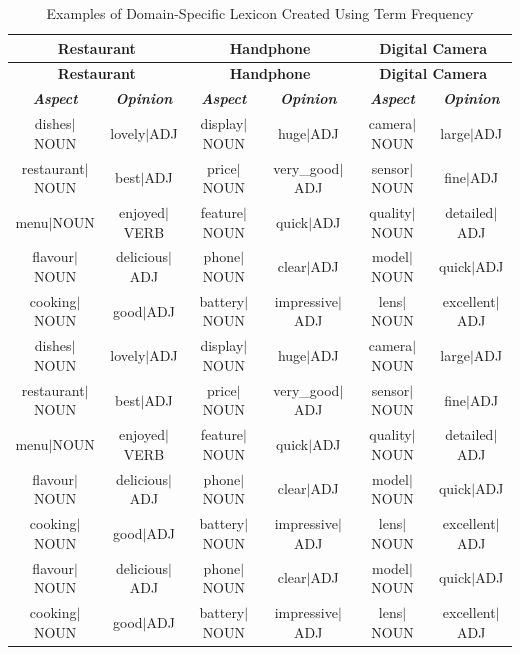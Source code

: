 \documentclass[a4paper,conference]{IEEEtran}
\begin{document}
\begin{table}[htbp]
\caption{Examples of Domain-Specific Lexicon Created Using Term Frequency}
\begin{center}
\begin{tabular}{|c|c|c|c|c|c|}
\hline
\multicolumn{2}{|c|}{\textbf{Restaurant}}&\multicolumn{2}{|c|}{\textbf{Handphone}}&\multicolumn{2}{|c|}{\textbf{Digital Camera}}\\
\hline
\multicolumn{2}{|c|}{\textbf{Restaurant}}&\multicolumn{2}{|c|}{\textbf{Handphone}}&\multicolumn{2}{|c|}{\textbf{Digital Camera}}\\
\hline 
\textbf{\textit{Aspect}}& \textbf{\textit{Opinion}}&\textbf{\textit{Aspect}}& \textbf{\textit{Opinion}}&\textbf{\textit{Aspect}}& \textbf{\textit{Opinion}}\\
\hline
dishes$\vert$NOUN&lovely$\vert$ADJ&display$\vert$NOUN & huge$\vert$ADJ& camera$\vert$NOUN& large$\vert$ADJ\\
\hline
restaurant$\vert$NOUN&best$\vert$ADJ&price$\vert$NOUN&very\_good$\vert$ADJ&sensor$\vert$NOUN&fine$\vert$ADJ\\
\hline
menu$\vert$NOUN&enjoyed$\vert$VERB&feature$\vert$NOUN&quick$\vert$ADJ&quality$\vert$NOUN&detailed$\vert$ADJ  \\
\hline
flavour$\vert$NOUN&delicious$\vert$ADJ&phone$\vert$NOUN&clear$\vert$ADJ&model$\vert$NOUN&quick$\vert$ADJ \\
\hline
cooking$\vert$NOUN&good$\vert$ADJ&battery$\vert$NOUN&impressive$\vert$ADJ&lens$\vert$NOUN&excellent$\vert$ADJ \\
\hline
dishes$\vert$NOUN&lovely$\vert$ADJ&display$\vert$NOUN & huge$\vert$ADJ& camera$\vert$NOUN& large$\vert$ADJ\\
\hline
restaurant$\vert$NOUN&best$\vert$ADJ&price$\vert$NOUN&very\_good$\vert$ADJ&sensor$\vert$NOUN&fine$\vert$ADJ\\
\hline
menu$\vert$NOUN&enjoyed$\vert$VERB&feature$\vert$NOUN&quick$\vert$ADJ&quality$\vert$NOUN&detailed$\vert$ADJ  \\
\hline
flavour$\vert$NOUN&delicious$\vert$ADJ&phone$\vert$NOUN&clear$\vert$ADJ&model$\vert$NOUN&quick$\vert$ADJ \\
\hline
cooking$\vert$NOUN&good$\vert$ADJ&battery$\vert$NOUN&impressive$\vert$ADJ&lens$\vert$NOUN&excellent$\vert$ADJ \\
\hline
flavour$\vert$NOUN&delicious$\vert$ADJ&phone$\vert$NOUN&clear$\vert$ADJ&model$\vert$NOUN&quick$\vert$ADJ \\
\hline
cooking$\vert$NOUN&good$\vert$ADJ&battery$\vert$NOUN&impressive$\vert$ADJ&lens$\vert$NOUN&excellent$\vert$ADJ \\
\hline
\end{tabular}
\label{tab2}
\end{center}
\end{table}
\end{document}
